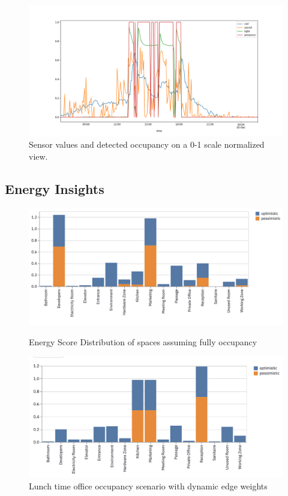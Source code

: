 \documentclass[conference]{IEEEtran}
\begin{document}
\begin{figure}
\centering
  \includegraphics[width=1\linewidth]{./img/occupancy.png}
  \caption{ Sensor values and detected occupancy on a 0-1 scale normalized view.}
  \label{fig:occupancy}
\end{figure}


\subsection{Energy Insights}


 \begin{figure}[h]
\centering
\includegraphics[width=.5\textwidth]{img/full-occupancy.png}
\caption{Energy Score Distribution of spaces assuming fully occupancy }\label{fig:full-occupancy}
\bigbreak
\includegraphics[width=.5\textwidth]{img/partial-occupancy.png}
\caption{Lunch time office occupancy scenario with dynamic edge weights}\label{fig:partial-occupancy}
\end{figure}

\end{document}
